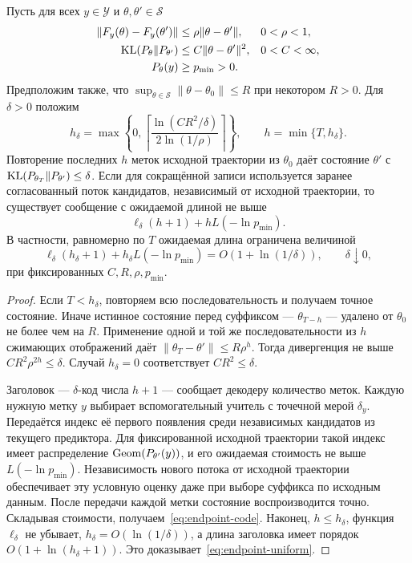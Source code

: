 \begin{theorem}
\label{thm:suffix}
Пусть для всех $y\in\mathcal Y$ и $\theta,\theta'\in\mathcal S$
\begin{align*}
 \|F_y(\theta)-F_y(\theta')\|&\le\rho\|\theta-\theta'\|,
                  &&0<\rho<1,\\
 \operatorname{KL}(P_\theta\Vert P_{\theta'})&\le C\|\theta-\theta'\|^2,
                  &&0<C<\infty,\\
 P_\theta(y)&\ge p_{\min}>0.
\end{align*}
Предположим также, что $\sup_{\theta\in\mathcal S}\|\theta-\theta_0\|\le R$
при некотором $R>0$.
Для $\delta>0$ положим
\begin{equation}
 h_\delta=\max\left\{0,
 \left\lceil\frac{\ln(CR^2/\delta)}{2\ln(1/\rho)}\right\rceil\right\},
 \qquad h=\min\{T,h_\delta\}.
 \label{eq:suffix-length}
\end{equation}
Повторение последних $h$ меток исходной траектории из $\theta_0$ даёт
состояние $\theta'$ с
$\operatorname{KL}(P_{\theta_T}\Vert P_{\theta'})\le\delta$.
Если для сокращённой записи используется заранее согласованный поток
кандидатов, независимый от исходной траектории, то существует сообщение
с ожидаемой длиной не выше
\begin{equation}
 \ell_\delta(h+1)+hL(-\ln p_{\min}).
 \label{eq:endpoint-code}
\end{equation}
В частности, равномерно по $T$ ожидаемая длина ограничена величиной
\begin{equation}
 \ell_\delta(h_\delta+1)+h_\delta L(-\ln p_{\min})
   =O(1+\ln(1/\delta)),\qquad \delta\downarrow0,
 \label{eq:endpoint-uniform}
\end{equation}
при фиксированных $C,R,\rho,p_{\min}$.
\end{theorem}
\begin{proof}
Если $T<h_\delta$, повторяем всю последовательность и получаем точное
состояние. Иначе истинное состояние перед суффиксом ---
$\theta_{T-h}$ --- удалено от $\theta_0$ не более чем на $R$.
Применение одной и той же последовательности из $h$ сжимающих отображений
даёт $\|\theta_T-\theta'\|\le R\rho^h$.
Тогда дивергенция не выше $CR^2\rho^{2h}\le\delta$.
Случай $h_\delta=0$ соответствует $CR^2\le\delta$.

Заголовок --- $\delta$-код числа $h+1$ --- сообщает декодеру количество
меток. Каждую нужную метку $y$ выбирает вспомогательный учитель с точечной
мерой $\delta_y$. Передаётся индекс её первого появления среди
независимых кандидатов из текущего предиктора. Для фиксированной исходной
траектории такой индекс имеет распределение
$\operatorname{Geom}(P_{\theta'}(y))$, и его ожидаемая стоимость не выше
$L(-\ln p_{\min})$. Независимость нового потока от исходной траектории
обеспечивает эту условную оценку даже при выборе суффикса по исходным данным.
После передачи каждой метки состояние воспроизводится точно. Складывая
стоимости, получаем~\eqref{eq:endpoint-code}.
Наконец, $h\le h_\delta$, функция $\ell_\delta$ не убывает,
$h_\delta=O(\ln(1/\delta))$, а длина заголовка имеет порядок
$O(1+\ln(h_\delta+1))$. Это доказывает~\eqref{eq:endpoint-uniform}.
\end{proof}

